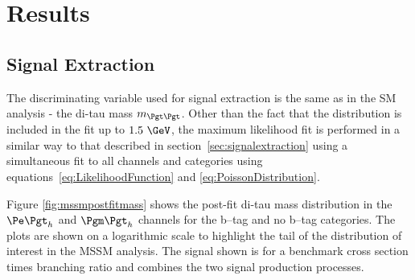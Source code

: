 

\section{Results}
\label{sec:mssmresults}

\subsection{Signal Extraction}
\label{sec:mssmSignalExtraction}

The discriminating variable used for signal extraction is the same as in the
\ac{SM} analysis - the di-tau mass $m_{\Pgt\Pgt}$. Other than the fact that the distribution is
included in the fit up to $1.5~\GeV$, the maximum likelihood fit is performed in
a similar way to that described in section~\ref{sec:signalextraction} using a simultaneous 
fit to all channels and
categories using equations~\ref{eq:LikelihoodFunction} and \ref{eq:PoissonDistribution}.

Figure \ref{fig:mssmpostfitmass} shows the post-fit di-tau mass distribution in the
$\etau$ and $\mutau$ channels for the b--tag and no b--tag categories. The plots
are shown on a logarithmic scale to highlight the tail of the distribution of
interest in the \ac{MSSM} analysis. The signal shown is for a benchmark cross
section times branching ratio and combines the two signal production processes.


